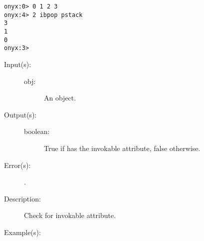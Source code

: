 \begin{description}
\begin{description}
\begin{verbatim}
onyx:0> 0 1 2 3
onyx:4> 2 ibpop pstack
3
1
0
onyx:3>
		\end{verbatim}
	\end{description}
\label{systemdict:icheck}
\item[{\onyxop{obj}{icheck}{boolean}}: ]
	\begin{description}\item[]
	\item[Input(s): ]
		\begin{description}\item[]
		\item[obj: ]
			An object.
		\end{description}
	\item[Output(s): ]
		\begin{description}\item[]
		\item[boolean: ]
			True if  has the invokable attribute, false
			otherwise.
		\end{description}
	\item[Error(s): ]
		\begin{description}\item[]
		\item[.]
		\end{description}
	\item[Description: ]
		Check  for invokable attribute.
	\item[Example(s): ]\begin{verbatim}


\end{verbatim}
\end{description}
\end{description}

